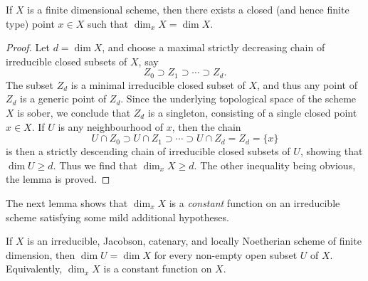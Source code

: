 \begin{lemma}
\label{lemma-dimension-achieved-by-finite-type-point}
If $X$ is a finite dimensional scheme,
then there exists a closed (and hence finite type) point $x \in X$
such that $\dim_x X = \dim X$.
\end{lemma}

\begin{proof}
Let $d = \dim X$,
and choose a maximal strictly decreasing
chain of irreducible closed subsets of $X$,
say
\begin{equation}
\label{equation-maximal-chain}
Z_0 \supset Z_1 \supset \cdots \supset Z_d.
\end{equation}
The subset $Z_d$ is a minimal irreducible closed subset of $X$,
and thus any point of $Z_d$ is a generic point of $Z_d$.
Since the underlying topological space of the scheme $X$ is sober,
we conclude that $Z_d$ is a singleton, consisting of a single
closed point $x \in X$.
If $U$ is
any neighbourhood of $x$, then
the chain
$$
U\cap Z_0 \supset U\cap Z_1 \supset \cdots \supset U\cap Z_d = Z_d =
\{x\}
$$
is then a strictly descending chain of irreducible
closed subsets of $U$, showing that $\dim U \geq d$.
Thus we find that $\dim_x X \geq d$.  The other inequality
being obvious, the lemma is proved.
\end{proof}

\noindent
The next lemma shows that $\dim_x X$ is a {\it constant} function
on an irreducible scheme satisfying some mild additional hypotheses.

\begin{lemma}
\label{lemma-constancy-of-dimension}
If $X$ is an irreducible, Jacobson, catenary, and locally Noetherian
scheme of finite dimension,
then $\dim U = \dim X$ for every
non-empty open subset $U$ of $X$.
Equivalently, $\dim_x X$ is a constant function on $X$.
\end{lemma}

